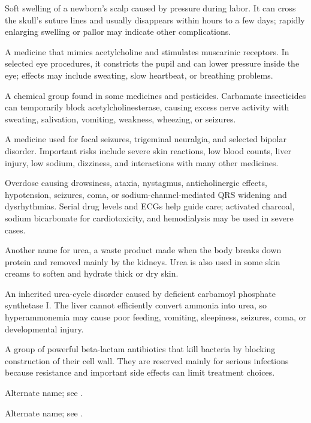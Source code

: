  Soft swelling of a newborn's scalp caused by pressure during labor. It can cross the skull's suture lines and usually disappears within hours to a few days; rapidly enlarging swelling or pallor may indicate other complications.

 A medicine that mimics acetylcholine and stimulates muscarinic receptors. In selected eye procedures, it constricts the pupil and can lower pressure inside the eye; effects may include sweating, slow heartbeat, or breathing problems.

 A chemical group found in some medicines and pesticides. Carbamate insecticides can temporarily block acetylcholinesterase, causing excess nerve activity with sweating, salivation, vomiting, weakness, wheezing, or seizures.

 A medicine used for focal seizures, trigeminal neuralgia, and selected bipolar disorder. Important risks include severe skin reactions, low blood counts, liver injury, low sodium, dizziness, and interactions with many other medicines.

 Overdose causing drowsiness, ataxia, nystagmus, anticholinergic effects, hypotension, seizures, coma, or sodium-channel-mediated QRS widening and dysrhythmias. Serial drug levels and ECGs help guide care; activated charcoal, sodium bicarbonate for cardiotoxicity, and hemodialysis may be used in severe cases.

 Another name for urea, a waste product made when the body breaks down protein and removed mainly by the kidneys. Urea is also used in some skin creams to soften and hydrate thick or dry skin.

 An inherited urea-cycle disorder caused by deficient carbamoyl phosphate synthetase I. The liver cannot efficiently convert ammonia into urea, so hyperammonemia may cause poor feeding, vomiting, sleepiness, seizures, coma, or developmental injury.

 A group of powerful beta-lactam antibiotics that kill bacteria by blocking construction of their cell wall. They are reserved mainly for serious infections because resistance and important side effects can limit treatment choices.

 Alternate name; see .

 Alternate name; see .

